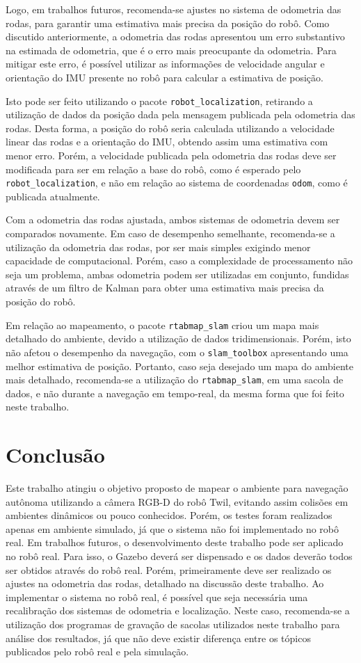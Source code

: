 \documentclass[repeatfields,xlists,xpacks,oneside,yearsonly]{ufrgscca}
\begin{document}
Logo, em trabalhos futuros, recomenda-se ajustes no sistema de
odometria das rodas, para garantir uma estimativa mais precisa da
posição do robô. Como discutido anteriormente, a odometria das rodas
apresentou um erro substantivo na estimada de odometria, que é o erro
mais preocupante da odometria. Para mitigar este erro, é possível
utilizar as informações de velocidade angular e orientação do IMU
presente no robô para calcular a estimativa de posição.

Isto pode ser feito utilizando o pacote \texttt{robot\_localization},
retirando a utilização de dados da posição dada pela mensagem
publicada pela odometria das rodas. Desta forma, a posição do robô
seria calculada utilizando a velocidade linear das rodas e a
orientação do IMU, obtendo assim uma estimativa com menor erro.
Porém, a velocidade publicada pela odometria das rodas deve ser
modificada para ser em relação a base do robô, como é esperado pelo
\texttt{robot\_localization}, e não em relação ao sistema de
coordenadas \texttt{odom}, como é publicada atualmente.

Com a odometria das rodas ajustada, ambos sistemas de odometria devem
ser comparados novamente. Em caso de desempenho semelhante,
recomenda-se a utilização da odometria das rodas, por ser mais
simples exigindo menor capacidade de computacional. Porém, caso a
complexidade de processamento não seja um problema, ambas odometria
podem ser utilizadas em conjunto, fundidas através de um filtro de
Kalman para obter uma estimativa mais precisa da posição do robô.

Em relação ao mapeamento, o pacote \texttt{rtabmap\_slam} criou um
mapa mais detalhado do ambiente, devido a utilização de dados
tridimensionais. Porém, isto não afetou o desempenho da navegação,
com o \texttt{slam\_toolbox} apresentando uma melhor estimativa de
posição. Portanto, caso seja desejado um mapa do ambiente mais
detalhado, recomenda-se a utilização do \texttt{rtabmap\_slam}, em
uma sacola de dados, e não durante a navegação em tempo-real, da
mesma forma que foi feito neste trabalho.

\chapter{Conclusão}
\label{conclusao}

Este trabalho atingiu o objetivo proposto de mapear o ambiente para
navegação autônoma utilizando a câmera RGB-D do robô Twil, evitando
assim colisões em ambientes dinâmicos ou pouco conhecidos. Porém, os
testes foram realizados apenas em ambiente simulado, já que o sistema
não foi implementado no robô real. Em trabalhos futuros, o
desenvolvimento deste trabalho pode ser aplicado no robô real. Para
isso, o Gazebo deverá ser dispensado e os dados deverão todos ser
obtidos através do robô real. Porém, primeiramente deve ser realizado
os ajustes na odometria das rodas, detalhado na discussão deste
trabalho. Ao implementar o sistema no robô real, é possível que seja
necessária uma recalibração dos sistemas de odometria e localização.
Neste caso, recomenda-se a utilização dos programas de gravação de
sacolas utilizados neste trabalho para análise dos resultados, já que
não deve existir diferença entre os tópicos publicados pelo robô real
e pela simulação.

\printbibliography

%
%
%
\end{document}
